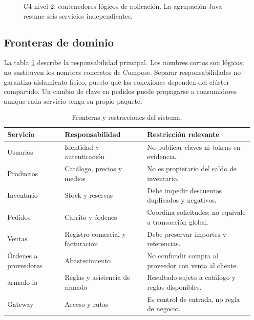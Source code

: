 \documentclass[12pt,a4paper]{article}
\begin{document}
\begin{figure}[H]\centering
{}
\caption{C4 nivel 2: contenedores lógicos de aplicación. La agrupación Java resume seis servicios independientes.}\label{fig:contenedores}
\end{figure}

\subsection{Fronteras de dominio}
La tabla \ref{tab:fronteras} describe la responsabilidad principal. Los nombres cortos son lógicos; no sustituyen los nombres concretos de Compose. Separar responsabilidades no garantiza aislamiento físico, puesto que las conexiones dependen del clúster compartido. Un cambio de clave en pedidos puede propagarse a consumidores aunque cada servicio tenga su propio paquete.

\begin{table}[H]\centering\small
\caption{Fronteras y restricciones del sistema.}\label{tab:fronteras}
\begin{tabularx}{\textwidth}{lXX}
\toprule Servicio & Responsabilidad & Restricción relevante\\\midrule
Usuarios & Identidad y autenticación & No publicar claves ni tokens en evidencia.\\
Productos & Catálogo, precios y medios & No es propietario del saldo de inventario.\\
Inventario & Stock y reservas & Debe impedir descuentos duplicados y negativos.\\
Pedidos & Carrito y órdenes & Coordina solicitudes; no equivale a transacción global.\\
Ventas & Registro comercial y facturación & Debe preservar importes y referencias.\\
Órdenes a proveedores & Abastecimiento & No confundir compra al proveedor con venta al cliente.\\
armado-ia & Reglas y asistencia de armado & Resultado sujeto a catálogo y reglas disponibles.\\
Gateway & Acceso y rutas & Es control de entrada, no regla de negocio.\\\bottomrule
\end{tabularx}
\end{table}
\end{document}
